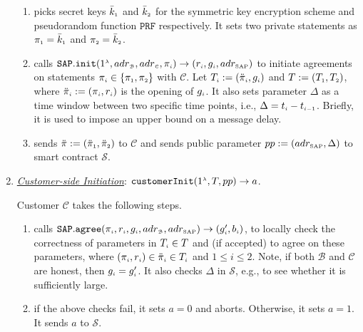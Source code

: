 \begin{enumerate}[leftmargin=.46cm]
\begin{enumerate}
\item\label{RCPoRP::setup} picks   secret keys $\bar k_{\scriptscriptstyle 1}$ and $\bar k_{\scriptscriptstyle 2}$ for the symmetric key encryption scheme and  pseudorandom function $\mathtt{PRF}$ respectively. It  sets two private statements as $\pi_{\scriptscriptstyle 1}=\bar k_{\scriptscriptstyle 1}$ and $\pi_{\scriptscriptstyle 2}= \bar k_{\scriptscriptstyle 2}$.
%
\item\label{RCPoRP::set-qp}  calls $\mathtt{SAP.init}(1^{\scriptscriptstyle\lambda}, adr_{\scriptscriptstyle\mathcal{B}}, adr_{\scriptscriptstyle\mathcal{C}}, \pi_{\scriptscriptstyle i})\rightarrow(r_{
\scriptscriptstyle i}, g_{\scriptscriptstyle i}, adr_{\scriptscriptstyle\text{SAP}})$ to initiate  agreements on  statements $\pi_{\scriptscriptstyle i}\in \{\pi_{\scriptscriptstyle 1}, \pi_{\scriptscriptstyle 2}\}$  with  $\mathcal{C}$.  Let $T_{\scriptscriptstyle i}:=(\ddot{\pi}_{\scriptscriptstyle i}, g_{\scriptscriptstyle i})$ and $T:=(T_{\scriptscriptstyle 1}, T_{\scriptscriptstyle 2})$,  where  $\ddot{\pi}_{\scriptscriptstyle i}:=(\pi_{\scriptscriptstyle i}, r_{\scriptscriptstyle i})$ is the opening of $g_{\scriptscriptstyle i}$.  It also sets parameter $\Delta$ as a time window between two specific time points, i.e., $\Delta=t_{\scriptscriptstyle i} - t_{\scriptscriptstyle i-1}$. Briefly, it is used to impose an upper bound on a message delay.  %
%
\item sends $\ddot{\pi}:=(\ddot{\pi}_{\scriptscriptstyle 1}, \ddot{\pi}_{\scriptscriptstyle 2})$ to   $\mathcal{C}$ and   sends  public parameter $pp:=(adr_{\scriptscriptstyle\text{SAP}},\Delta)$ to  smart contract $\mathcal{S}$.
%
\end{enumerate}


\item  \underline{\textit{Customer-side Initiation}}\label{customer-side-Initiation}: $\mathtt{customerInit} (1^{\scriptscriptstyle \lambda}, T, pp)\rightarrow a$.
%

Customer $\mathcal{C}$ takes the following steps. 

\begin{enumerate}
%
\item\label{customer-side-Initiation-SAP-agree} calls   $\mathtt{SAP.agree}(\pi_{\scriptscriptstyle i}, r_{\scriptscriptstyle i}, g_{\scriptscriptstyle i}, adr_{\scriptscriptstyle\mathcal{B}}, adr_{\scriptscriptstyle\text{SAP}})\rightarrow (g'_{\scriptscriptstyle i}, b_{\scriptscriptstyle i})$, to locally check the correctness of parameters in $T_{\scriptscriptstyle i}\in T$ and (if accepted) to agree on these parameters, where $(\pi_{\scriptscriptstyle i}, r_{\scriptscriptstyle i}) \in \ddot{\pi}_{\scriptscriptstyle i}\in T_{\scriptscriptstyle i}$ and $1\leq i \leq 2$. Note,  if both $\mathcal{B}$ and $\mathcal{C}$ are honest, then $g_{\scriptscriptstyle i}=g'_{\scriptscriptstyle i}$. It also checks $\Delta$ in  $\mathcal{S}$, e.g., to see whether it is sufficiently large.
%
\item if the above checks fail,  it sets $a=0$ and aborts. Otherwise, it sets $a=1$. It sends $a$ to $\mathcal{S}$. 
\end{enumerate}
%


\end{enumerate}
